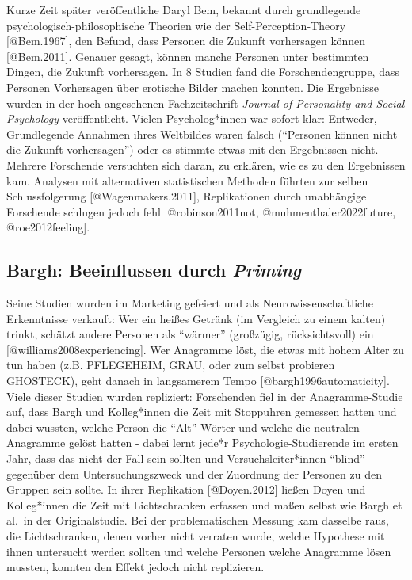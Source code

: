 \documentclass[
  letterpaper,
  DIV=11,
  numbers=noendperiod]{scrreprt}
\begin{document}
Kurze Zeit später veröffentliche Daryl Bem, bekannt durch grundlegende
psychologisch-philosophische Theorien wie der Self-Perception-Theory
{[}@Bem.1967{]}, den Befund, dass Personen die Zukunft vorhersagen
können {[}@Bem.2011{]}. Genauer gesagt, können manche Personen unter
bestimmten Dingen, die Zukunft vorhersagen. In 8 Studien fand die
Forschendengruppe, dass Personen Vorhersagen über erotische Bilder
machen konnten. Die Ergebnisse wurden in der hoch angesehenen
Fachzeitschrift \emph{Journal of Personality and Social Psychology}
veröffentlicht. Vielen Psycholog*innen war sofort klar: Entweder,
Grundlegende Annahmen ihres Weltbildes waren falsch (``Personen können
nicht die Zukunft vorhersagen'') oder es stimmte etwas mit den
Ergebnissen nicht. Mehrere Forschende versuchten sich daran, zu
erklären, wie es zu den Ergebnissen kam. Analysen mit alternativen
statistischen Methoden führten zur selben Schlussfolgerung
{[}@Wagenmakers.2011{]}, Replikationen durch unabhängige Forschende
schlugen jedoch fehl {[}@robinson2011not, @muhmenthaler2022future,
@roe2012feeling{]}.

\subsection{\texorpdfstring{Bargh: Beeinflussen durch
\emph{Priming}}{Bargh: Beeinflussen durch Priming}}\label{bargh-beeinflussen-durch-priming}

Seine Studien wurden im Marketing gefeiert und als
Neurowissenschaftliche Erkenntnisse verkauft: Wer ein heißes Getränk (im
Vergleich zu einem kalten) trinkt, schätzt andere Personen als
``wärmer'' (großzügig, rücksichtsvoll) ein
{[}@williams2008experiencing{]}. Wer Anagramme löst, die etwas mit hohem
Alter zu tun haben (z.B. PFLEGEHEIM, GRAU, oder zum selbst probieren
GHOSTECK), geht danach in langsamerem Tempo
{[}@bargh1996automaticity{]}. Viele dieser Studien wurden repliziert:
Forschenden fiel in der Anagramme-Studie auf, dass Bargh und
Kolleg*innen die Zeit mit Stoppuhren gemessen hatten und dabei wussten,
welche Person die ``Alt''-Wörter und welche die neutralen Anagramme
gelöst hatten - dabei lernt jede*r Psychologie-Studierende im ersten
Jahr, dass das nicht der Fall sein sollten und Versuchsleiter*innen
``blind'' gegenüber dem Untersuchungszweck und der Zuordnung der
Personen zu den Gruppen sein sollte. In ihrer Replikation
{[}@Doyen.2012{]} ließen Doyen und Kolleg*innen die Zeit mit
Lichtschranken erfassen und maßen selbst wie Bargh et al.~in der
Originalstudie. Bei der problematischen Messung kam dasselbe raus, die
Lichtschranken, denen vorher nicht verraten wurde, welche Hypothese mit
ihnen untersucht werden sollten und welche Personen welche Anagramme
lösen mussten, konnten den Effekt jedoch nicht replizieren.
\end{document}
